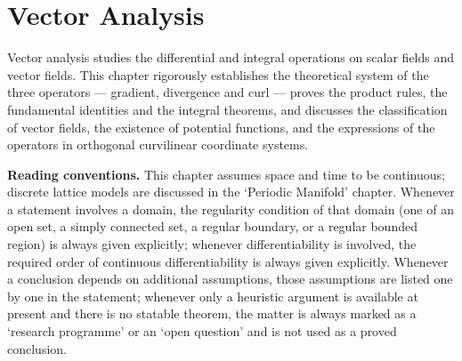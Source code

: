 \chapter{Vector Analysis}

\begin{remark}\label{rem:vector_analysis_chapter_positioning}
Vector analysis studies the differential and integral operations on scalar fields and vector fields. This chapter rigorously establishes the theoretical system of the three operators --- gradient, divergence and curl --- proves the product rules, the fundamental identities and the integral theorems, and discusses the classification of vector fields, the existence of potential functions, and the expressions of the operators in orthogonal curvilinear coordinate systems.

\textbf{Reading conventions.} This chapter assumes space and time to be continuous; discrete lattice models are discussed in the `Periodic Manifold' chapter. Whenever a statement involves a domain, the regularity condition of that domain (one of an open set, a simply connected set, a regular boundary, or a regular bounded region) is always given explicitly; whenever differentiability is involved, the required order of continuous differentiability is always given explicitly. Whenever a conclusion depends on additional assumptions, those assumptions are listed one by one in the statement; whenever only a heuristic argument is available at present and there is no statable theorem, the matter is always marked as a `research programme' or an `open question' and is not used as a proved conclusion.
\end{remark}

